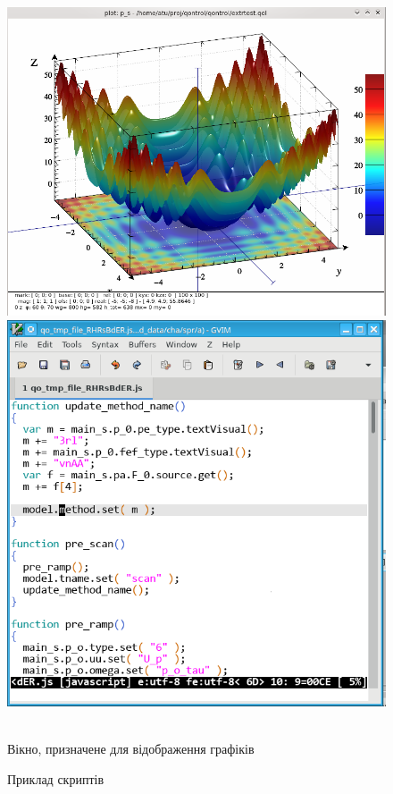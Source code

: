 \documentclass[14pt,handout,utf8]{beamer}
\newlength\DDP
\begin{document}
\begin{frame}
  \begin{figure}[htb!]
    \begin{center}
      ~ \hfill
      \includegraphics[width=\DDP]{../p4/p/qontrol_3d_a.png}
      \hfill
      \includegraphics[width=\DDP]{../p4/p/qontrol_js.png}
      \hfill ~
    \end{center}
    \parbox[t]{\DDP} {
      \caption{Вікно, призначене для відображення графіків}
      \label{atu:f:qontrol_3d}
    } \hfill
    \parbox[t]{\DDP} {
      \caption{Приклад скриптів}
      \label{atu:f:qontrol_js}
    }
  \end{figure}


\end{frame}
\end{document}
